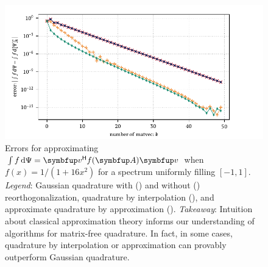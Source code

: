 \begin{figure}[htb]
    \begin{center}
        \includegraphics{imgs/ch3_runge_uniform_spec.pdf} 
    \end{center}
    \caption[{Errors for approximating \( \int f \,\d\Psi =  \vec{v}^\cT f(\vec{A}) \vec{v} \) when \( f(x) = 1/(1+16x^2) \) for a spectrum uniformly filling \( [-1,1] \).}]{%
    Errors for approximating \( \int f \,\d\Psi =  \vec{v}^\cT f(\vec{A}) \vec{v} \) when \( f(x) = 1/(1+16x^2) \) for a spectrum uniformly filling       \( [-1,1] \).
    \hspace{.25em}\emph{Legend}:
    Gaussian quadrature with 
    ({\protect{}})
    and without 
    ({\protect{}})
    reorthogonalization,
    quadrature by interpolation
    ({\protect{}}),
    and approximate quadrature by approximation
    ({\protect{}}).
    \hspace{.25em}\emph{Takeaway}: Intuition about classical approximation theory informs our understanding of algorithms for matrix-free quadrature.
    In fact, in some cases, quadrature by interpolation or approximation can provably outperform Gaussian quadrature.
    }
    \label{fig:ch3_runge_uniform_spec}
\end{figure}

